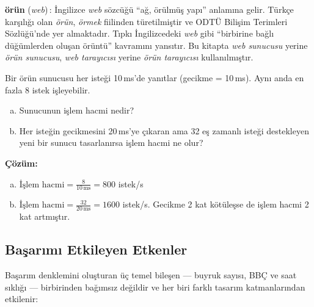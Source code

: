 \begin{terimnotu}
\textbf{örün} (\emph{web})\,: İngilizce \emph{web} sözcüğü ``ağ, örülmüş yapı'' anlamına gelir. Türkçe karşılığı olan \emph{örün}, \emph{örmek} fiilinden türetilmiştir ve ODTÜ Bilişim Terimleri Sözlüğü'nde yer almaktadır. Tıpkı İngilizcedeki \emph{web} gibi ``birbirine bağlı düğümlerden oluşan örüntü'' kavramını yansıtır. Bu kitapta \emph{web sunucusu} yerine \emph{örün sunucusu}, \emph{web tarayıcısı} yerine \emph{örün tarayıcısı} kullanılmıştır.
\end{terimnotu}

\begin{ornek}[2.4]
Bir örün sunucusu her isteği 10\,ms'de yanıtlar (gecikme = 10\,ms). Aynı anda en fazla 8 istek işleyebilir.
\begin{enumerate}[(a)]
    \item Sunucunun işlem hacmi nedir?
    \item Her isteğin gecikmesini 20\,ms'ye çıkaran ama 32 eş zamanlı isteği destekleyen yeni bir sunucu tasarlanırsa işlem hacmi ne olur?
\end{enumerate}

\textbf{Çözüm:}
\begin{enumerate}[(a)]
    \item $\text{İşlem hacmi} = \frac{8}{10\,\text{ms}} = 800$ istek/s
    \item $\text{İşlem hacmi} = \frac{32}{20\,\text{ms}} = 1600$ istek/s. Gecikme 2 kat kötüleşse de işlem hacmi 2 kat artmıştır.
\end{enumerate}
\end{ornek}


\subsection{Başarımı Etkileyen Etkenler}
\label{subsec:basarim-faktorleri}

Başarım denklemini oluşturan üç temel bileşen --- buyruk sayısı, BBÇ ve saat sıklığı --- birbirinden bağımsız değildir ve her biri farklı tasarım katmanlarından etkilenir:

